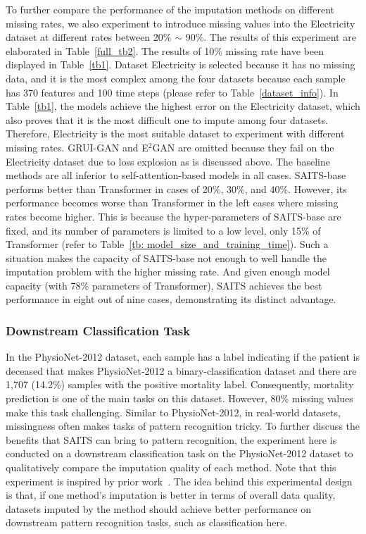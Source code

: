 \documentclass{article}
\begin{document}
To further compare the performance of the imputation methods on different missing rates, we also experiment to introduce missing values into the Electricity dataset at different rates between 20\% $\sim$ 90\%. The results of this experiment are elaborated in Table~\ref{full_tb2}. The results of 10\% missing rate have been displayed in Table~\ref{tb1}. Dataset Electricity is selected because it has no missing data, and it is the most complex among the four datasets because each sample has 370 features and 100 time steps (please refer to Table~\ref{dataset_info}). In Table~\ref{tb1}, the models achieve the highest error on the Electricity dataset, which also proves that it is the most difficult one to impute among four datasets. Therefore, Electricity is the most suitable dataset to experiment with different missing rates. GRUI-GAN and E$^2$GAN are omitted because they fail on the Electricity dataset due to loss explosion as is discussed above. The baseline methods are all inferior to self-attention-based models in all cases. SAITS-base performs better than Transformer in cases of 20\%, 30\%, and 40\%. However, its performance becomes worse than Transformer in the left cases where missing rates become higher. This is because the hyper-parameters of SAITS-base are fixed, and its number of parameters is limited to a low level, only 15\% of Transformer (refer to Table~\ref{tb: model_size_and_training_time}). Such a situation makes the capacity of SAITS-base not enough to well handle the imputation problem with the higher missing rate. And given enough model capacity (with 78\% parameters of Transformer), SAITS achieves the best performance in eight out of nine cases, demonstrating its distinct advantage.

\subsubsection{Downstream Classification Task} \label{downstream_task}
In the PhysioNet-2012 dataset, each sample has a label indicating if the patient is deceased that makes PhysioNet-2012 a binary-classification dataset and there are 1,707 (14.2\%) samples with the positive mortality label. Consequently, mortality prediction is one of the main tasks on this dataset. However, 80\% missing values make this task challenging. Similar to PhysioNet-2012, in real-world datasets, missingness often makes tasks of pattern recognition tricky. To further discuss the benefits that SAITS can bring to pattern recognition, the experiment here is conducted on a downstream classification task on the PhysioNet-2012 dataset to qualitatively compare the imputation quality of each method. Note that this experiment is inspired by prior work~\cite{Cao2018BRITS, Luo2018GRUI, Luo2019E2GAN, Fortuin2020GPVAE, Ramchandran2021LVAE}. The idea behind this experimental design is that, if one method's imputation is better in terms of overall data quality, datasets imputed by the method should achieve better performance on downstream pattern recognition tasks, such as classification here.
\end{document}
